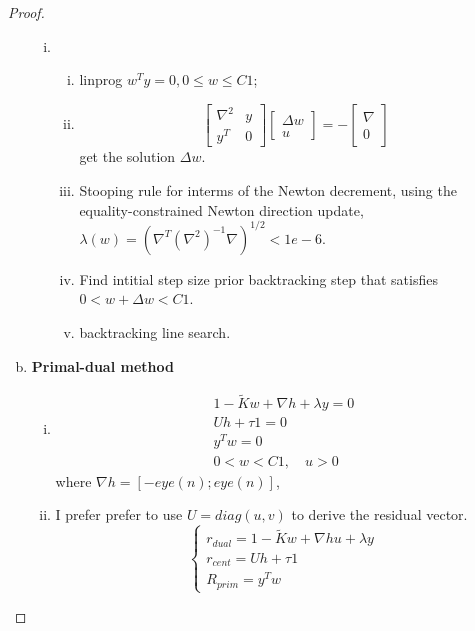 \documentclass{article}
\theoremstyle{remark}
\theoremstyle{definition}
\begin{document}
\begin{proof}
\begin{enumerate}[(a)]
\begin{enumerate}[(i)]
        \item \begin{enumerate}[(i)]
            \item linprog $w^Ty=0, 0\leq w\leq C1$;
            \item \[\begin{bmatrix}
            \nabla^2 & y\\
            y^T & 0 
            \end{bmatrix}\begin{bmatrix}
            \Delta w\\
            u 
            \end{bmatrix}=-\begin{bmatrix}
            \nabla \\
            0
            \end{bmatrix}
            \]
            get the solution $\Delta w$.
            \item Stooping rule for interms of the Newton decrement, using the equality-constrained Newton direction update,  $\lambda(w)=\left(\nabla^T(\nabla^2)^{-1}\nabla\right)^{1/2}<1e-6$.
            \item  Find intitial step size prior backtracking step that satisfies $0< w+\Delta w< C1$.
            \item backtracking line search.
            \end{enumerate}
        \end{enumerate}
        \item \textbf{Primal-dual method}
        \begin{enumerate}[(i)]
            \item 
            \begin{align*}
            1-\widetilde{K}w+\nabla h +\lambda y=0\\
            Uh +\tau 1=0\\
            y^Tw = 0\\
            0<w<C1,\quad u>0
            \end{align*}
        where $\nabla h=[-eye(n);eye(n)]$, 
        \item I prefer prefer to use $U=diag(u,v)$ to derive the residual vector.
        \[\begin{cases}
            r_{dual}= 1-\widetilde{K}w+\nabla hu +\lambda y\\
            r_{cent} = Uh + \tau 1\\
            R_{prim} = y^Tw
        \end{cases}
        \]
        

\end{enumerate}
\end{enumerate}
\end{proof}
\end{document}
